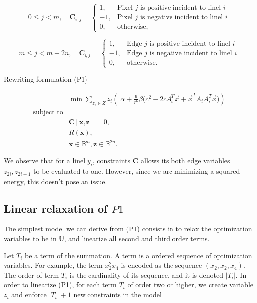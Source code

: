 \[
	0 \leq j < m, \quad \mathbf{C}_{i,j} = \left\{ \begin{array}{ll}
	
	1,& \text{Pixel $j$ is positive incident to linel $i$}\\
	-1,& \text{Pixel $j$ is negative incident to linel $i$}\\	
	0,& \text{otherwise},
	\end{array}\right.
\]

\[
	m \leq j < m + 2n, \quad \mathbf{C}_{i,j} = \left\{ \begin{array}{ll}
	
	1,& \text{Edge $j$ is positive incident to linel $i$}\\
	-1,& \text{Edge $j$ is negative incident to linel $i$}\\	
	0,& \text{otherwise}.
	\end{array}\right.
\]

Rewriting formulation (P1)

\[
\begin{array}{ll}
& \displaystyle	\min \sum_{z_i \in Z}{ z_i \left(\; \alpha + \frac{9}{r^6}\beta \big(c^2 - 2cA_i^T\vec{x} + \vec{x}^TA_iA_i^T\vec{x}\big)\right)} \\
\text{subject to}\\
&	\mathbf{C}[ \mathbf{x}, \mathbf{z}] = 0,\\
&   R(\mathbf{x}),\\
&   \mathbf{x} \in \mathbb{B}^{m}, \mathbf{z} \in \mathbb{B}^{2n}.
\end{array}
\]


We observe that for a linel $y_i$, constraints $\mathbf{C}$ allows its both edge variables $z_{2i},z_{2i+1}$ to be evaluated to one. However, since we are minimizing a squared energy, this doesn't pose an issue.




\subsection{Linear relaxation of $P1$}

	The simplest model we can derive from (P1) consists in to relax the optimization variables to be in $\mathbb{U}$, and linearize all second and third order terms. 
	
	Let $T_i$ be a term of the summation. A term is a ordered sequence of optimization variables. For example, the term $x_2^2x_4$ is encoded as the sequence $(x_2,x_2,x_4)$. The order of term $T_i$ is the cardinality of its sequence, and it is denoted $|T_i|$. In order to linearize (P1), for each term $T_i$ of order two or higher, we create variable $z_i$ and enforce $|T_i|+1$ new constraints in the model
	
